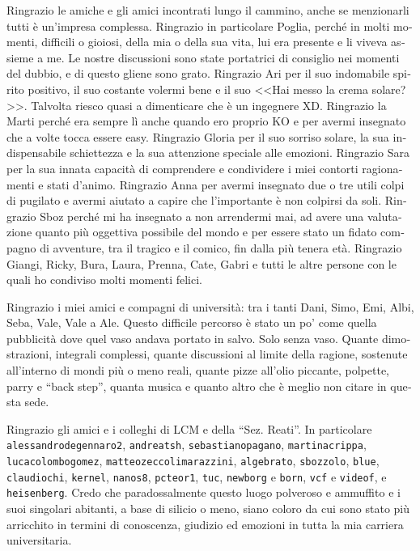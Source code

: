 \begin{otherlanguage}{italian}
Ringrazio le amiche e gli amici incontrati lungo il cammino, anche se
menzionarli tutti \`e un'impresa complessa. Ringrazio in particolare
Poglia, perch\'e in molti momenti, difficili o gioiosi, della mia o della
sua vita, lui era presente e li viveva assieme a me. Le nostre discussioni
sono state portatrici di consiglio nei momenti del dubbio, e di questo
gliene sono grato. Ringrazio Ari per il suo indomabile spirito positivo, il
suo costante volermi bene e il suo <<Hai messo la crema solare?>>. Talvolta
riesco quasi a dimenticare che \`e un ingegnere XD.  Ringrazio la Marti
perch\'e era sempre l\`i anche quando ero proprio KO e per avermi insegnato
che a volte tocca essere easy.  Ringrazio Gloria per il suo sorriso solare, la
sua indispensabile schiettezza e la sua attenzione speciale alle emozioni.
Ringrazio Sara per la sua innata capacit\`a di comprendere e condividere i
miei contorti ragionamenti e stati d'animo.  Ringrazio Anna per avermi
insegnato due o tre utili colpi di pugilato e avermi aiutato a capire che
l'importante \`e non colpirsi da soli.  Ringrazio Sboz perch\'e mi ha
insegnato a non arrendermi mai, ad avere una valutazione quanto pi\`u
oggettiva possibile del mondo e per essere stato un fidato compagno di
avventure, tra il tragico e il comico, fin dalla pi\`u tenera et\`a.
Ringrazio Giangi, Ricky, Bura, Laura, Prenna, Cate, Gabri e tutti le altre
persone con le quali ho condiviso molti momenti felici.

Ringrazio i miei amici e compagni di universit\`a: tra i tanti Dani, Simo,
Emi, Albi, Seba, Vale, Vale a Ale. Questo difficile percorso \`e stato un po' come
quella pubblicit\`a dove quel vaso andava portato in salvo. Solo senza
vaso. Quante dimostrazioni, integrali complessi, quante discussioni al
limite della ragione, sostenute all'interno di mondi pi\`u o meno reali,
quante pizze all'olio piccante, polpette, parry e ``back step'', quanta
musica e quanto altro che \`e meglio non citare in questa sede.

Ringrazio gli amici e i colleghi di LCM e della ``Sez. Reati''. In
particolare \texttt{alessandrodegennaro2}, \texttt{andreatsh},
\texttt{sebastianopagano}, \texttt{martinacrippa},
\texttt{lucacolombogomez}, \texttt{matteozeccolimarazzini},
\texttt{algebrato}, \texttt{sbozzolo}, \texttt{blue}, \texttt{claudiochi},
\texttt{kernel}, \texttt{nanos8}, \texttt{pcteor1}, \texttt{tuc},
\texttt{newborg} e \texttt{born}, \texttt{vcf} e \texttt{videof}, e
\texttt{heisenberg}. Credo che paradossalmente questo luogo polveroso e
ammuffito e i suoi singolari abitanti, a base di silicio o meno, siano
coloro da cui sono stato pi\`u arricchito in termini di conoscenza,
giudizio ed emozioni in tutta la mia carriera universitaria.


\end{otherlanguage}
